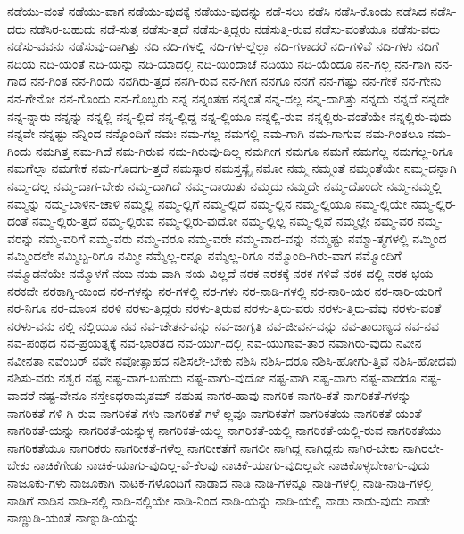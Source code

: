 {ನಡೆಯು-ವಂತೆ
ನಡೆಯು-ವಾಗ
ನಡೆಯು-ವುದಕ್ಕೆ
ನಡೆಯು-ವುದನ್ನು
ನಡೆ-ಸಲು
ನಡೆಸಿ
ನಡೆಸಿ-ಕೊಂಡು
ನಡೆಸಿದ
ನಡೆಸಿ-ದರು
ನಡೆಸಿರ-ಬಹುದು
ನಡೆ-ಸುತ್ತ
ನಡೆಸು-ತ್ತದೆ
ನಡೆಸು-ತ್ತಿದ್ದರು
ನಡೆಸುತ್ತಿ-ರುವ
ನಡೆಸು-ವಂತೆಯೂ
ನಡೆಸು-ವರು
ನಡೆಸು-ವವನು
ನಡೆಸುವು-ದಾಗಿತ್ತು
ನದಿ
ನದಿ-ಗಳಲ್ಲಿ
ನದಿ-ಗಳ-ಲ್ಲೆಲ್ಲಾ
ನದಿ-ಗಳಾದರೆ
ನದಿ-ಗಳಿವೆ
ನದಿ-ಗಳು
ನದಿಗೆ
ನದಿಯ
ನದಿ-ಯಂತೆ
ನದಿ-ಯನ್ನು
ನದಿ-ಯಾದಲ್ಲಿ
ನದಿ-ಯಿಂದಾಚೆ
ನದಿಯು
ನದಿ-ಯೆಂದೂ
ನನ-ಗಲ್ಲ
ನನ-ಗಾಗಿ
ನನ-ಗಾದ
ನನ-ಗಿಂತ
ನನ-ಗಿಂದು
ನನಗಿರು-ತ್ತದೆ
ನನಗಿ-ರುವ
ನನ-ಗೀಗ
ನನಗೂ
ನನಗೆ
ನನ-ಗೆಷ್ಟು
ನನ-ಗೇಕೆ
ನನ-ಗೇನು
ನನ-ಗೇನೋ
ನನ-ಗೊಂದು
ನನ-ಗೊಬ್ಬರು
ನನ್ನ
ನನ್ನಂತಹ
ನನ್ನಂತೆ
ನನ್ನ-ದಲ್ಲ
ನನ್ನ-ದಾಗಿತ್ತು
ನನ್ನದು
ನನ್ನದೆ
ನನ್ನದೇ
ನನ್ನ-ನ್ನಾರು
ನನ್ನನ್ನು
ನನ್ನಲ್ಲಿ
ನನ್ನ-ಲ್ಲಿದೆ
ನನ್ನ-ಲ್ಲಿದ್ದ
ನನ್ನ-ಲ್ಲಿಯೂ
ನನ್ನಲ್ಲಿ-ರುವ
ನನ್ನಲ್ಲಿರು-ವಂತೆಯೇ
ನನ್ನಲ್ಲಿರು-ವುದು
ನನ್ನವೇ
ನನ್ನಷ್ಟು
ನನ್ನಿಂದ
ನನ್ನೊಂದಿಗೆ
ನಮಃ
ನಮ-ಗಲ್ಲ
ನಮಗಲ್ಲಿ
ನಮ-ಗಾಗಿ
ನಮ-ಗಾಗುವ
ನಮ-ಗಿಂತಲೂ
ನಮ-ಗಿಂದು
ನಮಗಿತ್ತ
ನಮ-ಗಿದೆ
ನಮ-ಗಿರುವ
ನಮ-ಗಿರುವು-ದಿಲ್ಲ
ನಮಗೀಗ
ನಮಗೂ
ನಮಗೆ
ನಮಗೆಲ್ಲ
ನಮಗೆಲ್ಲ-ರಿಗೂ
ನಮಗೆಲ್ಲಾ
ನಮಗೇಕೆ
ನಮ-ಗೊದಗು-ತ್ತದೆ
ನಮಸ್ಕಾರ
ನಮಸ್ತಸ್ಯೈ
ನಮೋ
ನಮ್ಮ
ನಮ್ಮಂತೆ
ನಮ್ಮಂತೆಯೇ
ನಮ್ಮ-ದನ್ನಾಗಿ
ನಮ್ಮ-ದಲ್ಲ
ನಮ್ಮ-ದಾಗ-ಬೇಕು
ನಮ್ಮ-ದಾಗಿದೆ
ನಮ್ಮ-ದಾಯಿತು
ನಮ್ಮದು
ನಮ್ಮದೇ
ನಮ್ಮ-ದೊಂದೇ
ನಮ್ಮ-ನಮ್ಮಲ್ಲಿ
ನಮ್ಮನ್ನು
ನಮ್ಮ-ಬಾಳಿನ-ಚಾಳಿ
ನಮ್ಮಲ್ಲಿ
ನಮ್ಮ-ಲ್ಲಿಗೆ
ನಮ್ಮ-ಲ್ಲಿದೆ
ನಮ್ಮ-ಲ್ಲಿನ
ನಮ್ಮ-ಲ್ಲಿಯೂ
ನಮ್ಮ-ಲ್ಲಿಯೇ
ನಮ್ಮ-ಲ್ಲಿರ-ದಂತೆ
ನಮ್ಮ-ಲ್ಲಿರು-ತ್ತದೆ
ನಮ್ಮ-ಲ್ಲಿರುವ
ನಮ್ಮ-ಲ್ಲಿರು-ವುದೋ
ನಮ್ಮ-ಲ್ಲಿಲ್ಲ
ನಮ್ಮ-ಲ್ಲಿವೆ
ನಮ್ಮಲ್ಲೇ
ನಮ್ಮ-ವರ
ನಮ್ಮ-ವರನ್ನು
ನಮ್ಮ-ವರಿಗೆ
ನಮ್ಮ-ವರು
ನಮ್ಮ-ವರೂ
ನಮ್ಮ-ವರೇ
ನಮ್ಮ-ವಾದ-ವನ್ನು
ನಮ್ಮಷ್ಟು
ನಮ್ಮಾ-ತ್ಮಗಳಲ್ಲಿ
ನಮ್ಮಿಂದ
ನಮ್ಮಿಂದಲೇ
ನಮ್ಮಿಬ್ಬ-ರಿಗೂ
ನಮ್ಮೀ
ನಮ್ಮೆಲ್ಲ-ರನ್ನೂ
ನಮ್ಮೆಲ್ಲ-ರಿಗೂ
ನಮ್ಮೊಂದಿ-ಗಿರು-ವಾಗ
ನಮ್ಮೊಂದಿಗೆ
ನಮ್ಮೊಡನೆಯೇ
ನಮ್ಮೊಳಗೆ
ನಯ
ನಯ-ವಾಗಿ
ನಯ-ವಿಲ್ಲದೆ
ನರಕ
ನರಕಕ್ಕೆ
ನರಕ-ಗಳಿವೆ
ನರಕ-ದಲ್ಲಿ
ನರಕ-ಭಯ
ನರಕವೇ
ನರಕಾಗ್ನಿ-ಯಿಂದ
ನರ-ಗಳನ್ನು
ನರ-ಗಳಲ್ಲಿ
ನರ-ಗಳು
ನರ-ನಾಡಿ-ಗಳಲ್ಲಿ
ನರ-ನಾರಿ-ಯರ
ನರ-ನಾರಿ-ಯರಿಗೆ
ನರ-ನಿಗೂ
ನರ-ಮಾಂಸ
ನರಳಿ
ನರಳು-ತ್ತಿದ್ದರು
ನರಳು-ತ್ತಿರುವ
ನರಳು-ತ್ತಿರು-ವರು
ನರಳು-ತ್ತಿರು-ವೆವು
ನರಳು-ವಂತೆ
ನರಳು-ವನು
ನಲ್ಲಿ
ನಲ್ಲಿಯೂ
ನವ
ನವ-ಚೇತನ-ವನ್ನು
ನವ-ಜಾಗೃತಿ
ನವ-ಜೀವನ-ವನ್ನು
ನವ-ತಾರುಣ್ಯದ
ನವ-ನವ
ನವ-ಪಂಥದ
ನವ-ಪ್ರಯತ್ನಕ್ಕೆ
ನವ-ಭಾರತದ
ನವ-ಯುಗ-ದಲ್ಲಿ
ನವ-ಯುಗಾವ-ತಾರ
ನವಾಗಿರು-ವುದು
ನವೀನ
ನವೀನತಾ
ನವೆಂಬರ್
ನವೇ
ನವೋತ್ಸಾಹದ
ನಶಿಸಲೇ-ಬೇಕು
ನಶಿಸಿ
ನಶಿಸಿ-ದರೂ
ನಶಿಸಿ-ಹೋಗು-ತ್ತಿವೆ
ನಶಿಸಿ-ಹೋದವು
ನಶಿಸು-ವರು
ನಶ್ವರ
ನಷ್ಟ
ನಷ್ಟ-ವಾಗ-ಬಹುದು
ನಷ್ಟ-ವಾಗು-ವುದೋ
ನಷ್ಟ-ವಾಗಿ
ನಷ್ಟ-ವಾಗು
ನಷ್ಟ-ವಾದರೂ
ನಷ್ಟ-ವಾದರೆ
ನಷ್ಟ-ವೇನೂ
ನಸ್ತೇಽಧರಾಮೃತಮ್
ನಹುಷ
ನಾಗರ-ಹಾವು
ನಾಗರಿಕ
ನಾಗರಿ-ಕತೆ
ನಾಗರಿಕತೆ-ಗಳನ್ನು
ನಾಗರಿಕತೆ-ಗಳಿ-ಗಿ-ರುವ
ನಾಗರಿಕತೆ-ಗಳು
ನಾಗರಿಕತೆ-ಗಳೆ-ಲ್ಲವೂ
ನಾಗರಿಕತೆಗೆ
ನಾಗರಿಕತೆಯ
ನಾಗರಿಕತೆ-ಯಂತೆ
ನಾಗರಿಕತೆ-ಯನ್ನು
ನಾಗರಿಕತೆ-ಯನ್ನುಳ್ಳ
ನಾಗರಿಕತೆ-ಯಲ್ಲ
ನಾಗರಿಕತೆ-ಯಲ್ಲಿ
ನಾಗರಿಕತೆ-ಯಲ್ಲಿ-ರುವ
ನಾಗರಿಕತೆಯು
ನಾಗರಿಕತೆಯೂ
ನಾಗರಿಕರು
ನಾಗರೀಕತೆ-ಗಳೆಲ್ಲ
ನಾಗರೀಕತೆಗೆ
ನಾಗಲೀ
ನಾಗಿದ್ದ
ನಾಗಿದ್ದನು
ನಾಗಿರ-ಬೇಕು
ನಾಗಿರಲೇ-ಬೇಕು
ನಾಚಿಕೆಗೇಡು
ನಾಚಿಕೆ-ಯಾಗು-ವುದಿಲ್ಲ-ವೆ-ಕೆಲವು
ನಾಚಿಕೆ-ಯಾಗು-ವುದಿಲ್ಲವೇ
ನಾಚಿಕೊಳ್ಳಬೇಕಾಗು-ವುದು
ನಾಜೂಕು-ಗಳು
ನಾಜೂಕಾಗಿ
ನಾಟಕ-ಗಳೊಂದಿಗೆ
ನಾಡಾದ
ನಾಡಿ
ನಾಡಿ-ಗಳನ್ನೂ
ನಾಡಿ-ಗಳಲ್ಲಿ
ನಾಡಿ-ನಾಡಿ-ಗಳಲ್ಲಿ
ನಾಡಿಗೆ
ನಾಡಿನ
ನಾಡಿ-ನಲ್ಲಿ
ನಾಡಿ-ನಲ್ಲಿಯೇ
ನಾಡಿ-ನಿಂದ
ನಾಡಿ-ಯನ್ನು
ನಾಡಿ-ಯಲ್ಲಿ
ನಾಡು
ನಾಡು-ವುದು
ನಾಡೇ
ನಾಣ್ಣುಡಿ-ಯಂತೆ
ನಾಣ್ನುಡಿ-ಯನ್ನು
}
